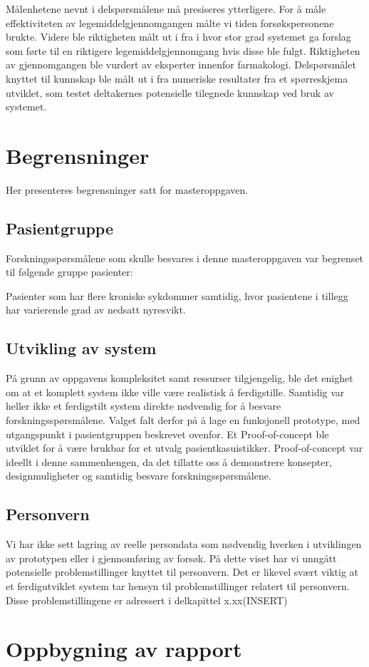 Målenhetene  nevnt i delspørsmålene må presiseres ytterligere. For å måle effektiviteten av legemiddelgjennomgangen målte vi tiden forsøkspersonene brukte. Videre ble riktigheten målt ut i fra i hvor stor grad systemet ga forslag som førte til en riktigere legemiddelgjennomgang hvis disse ble fulgt. Riktigheten av gjennomgangen ble vurdert av eksperter innenfor farmakologi. Delspørsmålet knyttet til kunnskap ble målt ut i fra numeriske resultater fra et spørreskjema utviklet, som testet deltakernes potensielle tilegnede kunnskap ved bruk av systemet.

\section{Begrensninger}
Her presenteres begrensninger satt  for masteroppgaven.
\subsection{Pasientgruppe}
Forskningsspørsmålene som skulle besvares i denne masteroppgaven var begrenset til følgende gruppe pasienter:

\hfill\begin{minipage}{\dimexpr\textwidth-3cm}
Pasienter som har flere kroniske sykdommer samtidig, hvor pasientene i tillegg har varierende grad av nedsatt nyresvikt.
\end{minipage}

\subsection{Utvikling av system}
På grunn av oppgavens kompleksitet samt ressurser tilgjengelig, ble det enighet  om at et komplett system ikke ville være realistisk å ferdigstille. Samtidig var heller ikke et ferdigstilt system direkte nødvendig for å besvare forskningsspørsmålene. Valget falt derfor \ob på å lage en funksjonell prototype, med utgangspunkt i pasientgruppen beskrevet ovenfor. Et Proof-of-concept ble utviklet for å være brukbar for et utvalg pasientkasuistikker. Proof-of-concept var ideellt i denne sammenhengen, da det tillatte oss å demonstrere konsepter, designmuligheter og samtidig besvare forskningsspørsmålene.      
\subsection{Personvern}
Vi har ikke sett lagring av reelle persondata som nødvendig hverken i utviklingen av prototypen eller i gjennomføring av forsøk. På dette viset har vi unngått potensielle problemstillinger knyttet til personvern. Det er likevel svært viktig at et ferdigutviklet system tar hensyn til problemstillinger relatert til personvern. Disse problemstillingene er adressert i delkapittel x.xx(INSERT)  



\section{Oppbygning av rapport}


